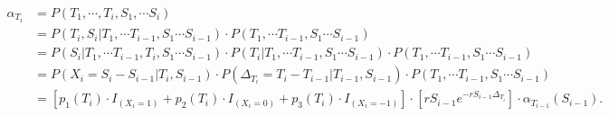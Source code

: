 \documentclass[10pt]{article}
\begin{document}
\begin{equation}
\begin{split}
\alpha_{T_i} & = P(T_1, \cdots, T_i, S_1, \cdots S_i) \\
& = P(T_i, S_i \vert T_1, \cdots T_{i-1}, S_1 \cdots S_{i-1}) \cdot P(T_1, \cdots T_{i-1}, S_1 \cdots S_{i-1}) \\
& = P(S_i \vert T_1, \cdots T_{i-1}, T_i, S_1 \cdots S_{i-1}) \cdot P(T_i \vert T_1, \cdots T_{i-1}, S_1 \cdots S_{i-1}) \cdot P(T_1, \cdots T_{i-1}, S_1 \cdots S_{i-1}) \\
& = P(X_i = S_i-S_{i-1} \vert T_i, S_{i-1}) \cdot P(\Delta_{T_i} = T_i - T_{i-1} \vert T_{i-1}, S_{i-1}) \cdot P(T_1, \cdots T_{i-1}, S_1 \cdots S_{i-1}) \\
& =  [p_1(T_i)\cdot I_{(X_i = 1)} + p_2(T_i)\cdot I_{(X_i = 0)} + p_3(T_i) \cdot I_{(X_i=-1)}] \cdot  [rS_{i-1} e^{-rS_{i-1} \Delta_{T_i}}] \cdot \alpha_{T_{i-1}}(S_{i-1}).
\end{split}
\end{equation}
\end{document}
